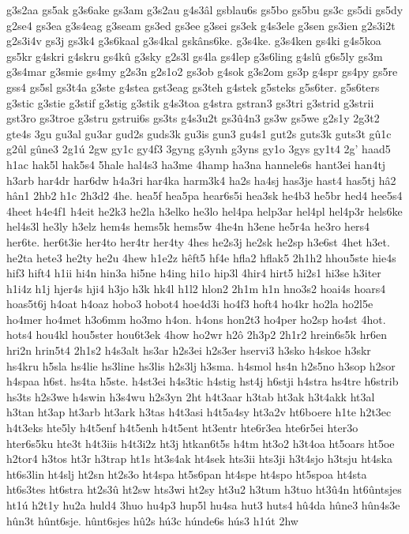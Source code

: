 {g3s2aa
gs5ak
g3s6ake
gs3am
g3s2au
g4s3âl
gsblau6s
gs5bo
gs5bu
gs3c
gs5di
gs5dy
g2se4
gs3ea
g3s4eag
g3seam
gs3ed
gs3ee
g3sei
gs3ek
g4s3ele
g3sen
gs3ien
g2s3i2t
g2s3i4v
gs3j
gs3k4
g3s6kaal
g3s4kal
gskâns6ke.
g3s4ke.
g3s4ken
gs4ki
g4s5koa
gs5kr
g4skri
g4skru
gs4kû
g3sky
g2s3l
gs4la
gs4lep
g3s6ling
g4slû
g6s5ly
gs3m
g3s4mar
g3smie
gs4my
g2s3n
g2s1o2
gs3ob
g4sok
g3s2om
gs3p
g4spr
gs4py
gs5re
gss4
gs5sl
gs3t4a
g3ste
g4stea
gst3eag
gs3teh
g4stek
g5steks
g5s6ter.
g5s6ters
g3stic
g3stie
g3stif
g3stig
g3stik
g4s3toa
g4stra
gstran3
gs3tri
g3strid
g3strii
gst3ro
gs3troe
g3stru
gstrui6s
gs3ts
g4s3u2t
gs3û4n3
gs3w
gs5we
g2s1y
2g3t2
gte4s
3gu
gu3al
gu3ar
gud2s
guds3k
gu3is
gun3
gu4s1
gut2s
guts3k
guts3t
gû1c
g2ûl
gûne3
2g1ú
2gw
gy1c
gy4f3
3gyng
g3ynh
g3yns
gy1o
3gys
gy1t4
2g'
haad5
h1ac
hak5l
hak5s4
5hale
hal4s3
ha3me
4hamp
ha3na
hannele6s
hant3ei
han4tj
h3arb
har4dr
har6dw
h4a3ri
har4ka
harm3k4
ha2s
ha4sj
has3je
hast4
has5tj
hâ2
hân1
2hb2
h1c
2h3d2
4he.
hea5f
hea5pa
hear6s5i
hea3sk
he4b3
he5br
hed4
hee5s4
4heet
h4e4f1
h4eit
he2k3
he2la
h3elko
he3lo
hel4pa
help3ar
hel4pl
hel4p3r
hels6ke
hel4s3l
he3ly
h3elz
hem4s
hems5k
hems5w
4he4n
h3ene
he5r4a
he3ro
hers4
her6te.
her6t3ie
her4to
her4tr
her4ty
4hes
he2s3j
he2sk
he2sp
h3e6st
4het
h3et.
he2ta
hete3
he2ty
he2u
4hew
h1e2z
hêft5
hf4e
hfla2
hflak5
2h1h2
hhou5ste
hie4s
hif3
hift4
h1ii
hi4n
hin3a
hi5ne
h4ing
hi1o
hip3l
4hir4
hirt5
hi2s1
hi3se
h3iter
h1i4z
h1j
hjer4s
hji4
h3jo
h3k
hk4l
h1l2
hlon2
2h1m
h1n
hno3s2
hoai4s
hoars4
hoas5t6j
h4oat
h4oaz
hobo3
hobot4
hoe4d3i
ho4f3
hoft4
ho4kr
ho2la
ho2l5e
ho4mer
ho4met
h3o6mm
ho3mo
h4on.
h4ons
hon2t3
ho4per
ho2sp
ho4st
4hot.
hots4
hou4kl
hou5ster
hou6t3ek
4how
ho2wr
h2ô
2h3p2
2h1r2
hrein6s5k
hr6en
hri2n
hrin5t4
2h1s2
h4s3alt
hs3ar
h2s3ei
h2s3er
hservi3
h3sko
h4skoe
h3skr
hs4kru
h5sla
hs4lie
hs3line
hs3lis
h2s3lj
h3sma.
h4smol
hs4n
h2s5no
h3sop
h2sor
h4spaa
h6st.
hs4ta
h5ste.
h4st3ei
h4s3tic
h4stig
hst4j
h6stji
h4stra
hs4tre
h6strib
hs3ts
h2s3we
h4swin
h3s4wu
h2s3yn
2ht
h4t3aar
h3tab
ht3ak
h3t4akk
ht3al
h3tan
ht3ap
ht3arb
ht3ark
h3tas
h4t3asi
h4t5a4sy
ht3a2v
ht6boere
h1te
h2t3ec
h4t3eks
hte5ly
h4t5enf
h4t5enh
h4t5ent
ht3entr
hte6r3ea
hte6r5ei
hter3o
hter6s5ku
hte3t
h4t3iis
h4t3i2z
ht3j
htkan6t5s
h4tm
ht3o2
h3t4oa
ht5oars
ht5oe
h2tor4
h3tos
ht3r
h3trap
ht1s
ht3s4ak
ht4sek
hts3ii
hts3ji
h3t4sjo
h3tsju
ht4ska
ht6s3lin
ht4slj
ht2sn
ht2s3o
ht4spa
ht5s6pan
ht4spe
ht4spo
ht5spoa
ht4sta
ht6s3tes
ht6stra
ht2s3û
ht2sw
hts3wi
ht2sy
ht3u2
h3tum
h3tuo
ht3û4n
ht6ûntsjes
ht1ú
h2t1y
hu2a
huld4
3huo
hu4p3
hup5l
hu4sa
hut3
huts4
hû4da
hûne3
hûn4s3e
hûn3t
hûnt6sje.
hûnt6sjes
hû2s
hú3c
húnde6s
hús3
h1út
2hw
}
